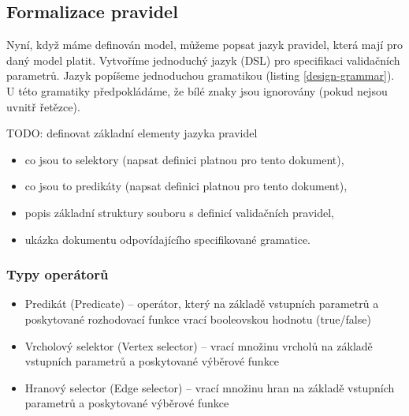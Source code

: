 
\subsection{Formalizace pravidel}

Nyní, když máme definován model, můžeme popsat jazyk pravidel, která mají pro daný model platit. Vytvoříme jednoduchý jazyk (DSL) pro specifikaci validačních parametrů. Jazyk popíšeme jednoduchou gramatikou (listing \ref{design-grammar}). U této gramatiky předpokládáme, že bílé znaky jsou ignorovány (pokud nejsou uvnitř řetězce).

TODO: definovat základní elementy jazyka pravidel

\begin{itemize}
\item co jsou to selektory (napsat definici platnou pro tento dokument),
\item co jsou to predikáty (napsat definici platnou pro tento dokument),
\item popis základní struktury souboru s definicí validačních pravidel,
\item ukázka dokumentu odpovídajícího specifikované gramatice.
\end{itemize}


\subsubsection{Typy operátorů}
\begin{itemize}
\item Predikát (Predicate) -- operátor, který na základě vstupních parametrů a poskytované rozhodovací funkce vrací booleovskou hodnotu (true/false)
\item Vrcholový selektor (Vertex selector) -- vrací množinu vrcholů na základě vstupních parametrů a poskytované výběrové funkce
\item Hranový selector (Edge selector) -- vrací množinu hran na základě vstupních parametrů a poskytované výběrové funkce
\end{itemize}


